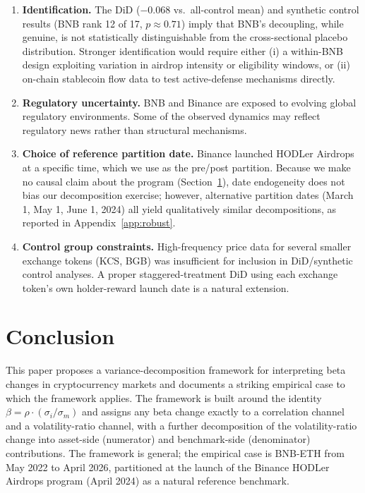 \documentclass[11pt,a4paper]{article}
\begin{document}
\begin{enumerate}
\item \textbf{Identification.} The DiD ($-0.068$ vs.\ all-control mean) and synthetic control results (BNB rank 12 of 17, $p\approx 0.71$) imply that BNB's decoupling, while genuine, is not statistically distinguishable from the cross-sectional placebo distribution. Stronger identification would require either (i) a within-BNB design exploiting variation in airdrop intensity or eligibility windows, or (ii) on-chain stablecoin flow data to test active-defense mechanisms directly.

\item \textbf{Regulatory uncertainty.} BNB and Binance are exposed to evolving global regulatory environments. Some of the observed dynamics may reflect regulatory news rather than structural mechanisms.

\item \textbf{Choice of reference partition date.} Binance launched HODLer Airdrops at a specific time, which we use as the pre/post partition. Because we make no causal claim about the program (Section~\ref{sec:conc}), date endogeneity does not bias our decomposition exercise; however, alternative partition dates (March 1, May 1, June 1, 2024) all yield qualitatively similar decompositions, as reported in Appendix~\ref{app:robust}.

\item \textbf{Control group constraints.} High-frequency price data for several smaller exchange tokens (KCS, BGB) was insufficient for inclusion in DiD/synthetic control analyses. A proper staggered-treatment DiD \citep{callaway2021} using each exchange token's own holder-reward launch date is a natural extension.
\end{enumerate}

\section{Conclusion} \label{sec:conc}

This paper proposes a variance-decomposition framework for interpreting beta changes in cryptocurrency markets and documents a striking empirical case to which the framework applies. The framework is built around the identity $\beta = \rho \cdot (\sigma_i/\sigma_m)$ and assigns any beta change exactly to a correlation channel and a volatility-ratio channel, with a further decomposition of the volatility-ratio change into asset-side (numerator) and benchmark-side (denominator) contributions. The framework is general; the empirical case is BNB-ETH from May 2022 to April 2026, partitioned at the launch of the Binance HODLer Airdrops program (April 2024) as a natural reference benchmark.
\end{document}
